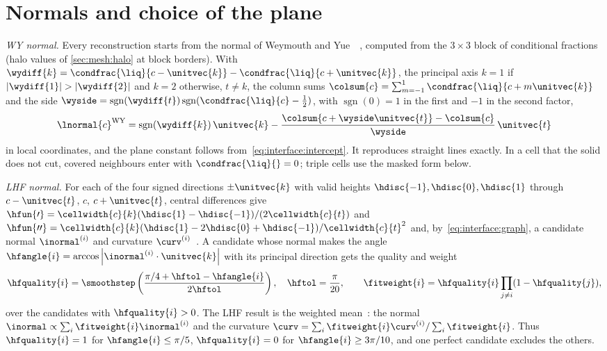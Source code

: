 \section{Normals and choice of the plane}\label{sec:interface:normals}
\emph{WY normal.} Every reconstruction starts from the normal of Weymouth and
Yue~\cite{weymouth2010}~, computed from the $3\times3$ block of
conditional fractions (halo values of \cref{sec:mesh:halo} at block borders).
With $\wydiff{k}=\condfrac{\liq}{c-\unitvec{k}}-\condfrac{\liq}{c+\unitvec{k}}$,
the principal axis $k=1$ if $\abs{\wydiff{1}}>\abs{\wydiff{2}}$ and $k=2$
otherwise, $t\neq k$, the column sums
$\colsum{c}=\sum_{m=-1}^{1}\condfrac{\liq}{c+m\unitvec{k}}$ and the side
$\wyside=\operatorname{sgn}(\wydiff{t})\operatorname{sgn}(\condfrac{\liq}{c}-\half)$,
with $\operatorname{sgn}(0)=1$ in the first and $-1$ in the second factor,
\begin{equation}\label{eq:interface:wy}
  \lnormal{c}^{\mathrm{WY}}=\operatorname{sgn}(\wydiff{k})\,\unitvec{k}
    -\frac{\colsum{c+\wyside\unitvec{t}}-\colsum{c}}{\wyside}\,\unitvec{t}
\end{equation}
in local coordinates, and the plane constant
follows from~\cref{eq:interface:intercept}. It reproduces straight lines
exactly. In a cell that the solid does not cut, covered neighbours enter with
$\condfrac{\liq}{}=0$; triple cells use the masked form below.

\emph{LHF normal.} For each of the four signed directions $\pm\unitvec{k}$
with valid heights $\hdisc{-1},\hdisc{0},\hdisc{1}$ through $c-\unitvec{t}$,
$c$, $c+\unitvec{t}$, central differences give
$\hfun{\prime}=\cellwidth{c}{k}(\hdisc{1}-\hdisc{-1})/(2\cellwidth{c}{t})$ and
$\hfun{\prime\prime}=\cellwidth{c}{k}(\hdisc{1}-2\hdisc{0}+\hdisc{-1})/\cellwidth{c}{t}^2$
and, by~\cref{eq:interface:graph}, a candidate normal $\inormal^{(i)}$ and
curvature $\curv^{(i)}$~. A candidate whose normal makes the
angle $\hfangle{i}=\arccos\abs{\inormal^{(i)}\cdot\unitvec{k}}$ with its
principal direction gets the quality and weight
\begin{equation}\label{eq:interface:lhf}
  \hfquality{i}=\smoothstep\roundpar{\frac{\pi/4+\hftol-\hfangle{i}}{2\hftol}},\quad
  \hftol=\frac{\pi}{20},\qquad
  \fitweight{i}=\hfquality{i}\prod_{j\neq i}(1-\hfquality{j}),
\end{equation}
over the candidates with $\hfquality{i}>0$. The LHF result is the weighted
mean~: the normal $\inormal\propto\sum_i\fitweight{i}\inormal^{(i)}$
and the curvature $\curv=\sum_i\fitweight{i}\curv^{(i)}/\sum_i\fitweight{i}$.
Thus $\hfquality{i}=1$ for $\hfangle{i}\le\pi/5$, $\hfquality{i}=0$ for
$\hfangle{i}\ge3\pi/10$, and one perfect candidate excludes the others.

